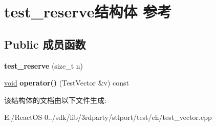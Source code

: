 \hypertarget{structtest__reserve}{}\section{test\+\_\+reserve结构体 参考}
\label{structtest__reserve}
\subsection*{Public 成员函数}
\begin{DoxyCompactItemize}
\item 
\mbox{\label{structtest__reserve_a9886cf8f960b1516ba6115eae435ac22}} 
{\bfseries test\+\_\+reserve} (size\+\_\+t n)
\item 
\mbox{\label{structtest__reserve_acecfa07d1bb9d52d7832bb40607fda43}} 
\hyperlink{interfacevoid}{void} {\bfseries operator()} (Test\+Vector \&v) const
\end{DoxyCompactItemize}


该结构体的文档由以下文件生成\+:\begin{DoxyCompactItemize}
\item 
E\+:/\+React\+O\+S-\/0../sdk/lib/3rdparty/stlport/test/eh/test\+\_\+vector.\+cpp\end{DoxyCompactItemize}
